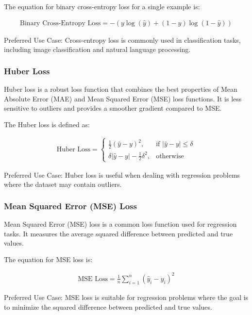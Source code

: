 The equation for binary cross-entropy loss for a single example is:

\begin{align}
	\text{Binary Cross-Entropy Loss} = -\left(y \log(\hat{y}) + (1 - y) \log(1 - \hat{y})\right)
\end{align}

Preferred Use Case: Cross-entropy loss is commonly used in classification tasks, including image classification and natural language processing.

\subsubsection{Huber Loss}

Huber loss is a robust loss function that combines the best properties of Mean Absolute Error (MAE) and Mean Squared Error (MSE) loss functions. It is less sensitive to outliers and provides a smoother gradient compared to MSE.

The Huber loss is defined as:

\begin{align}
	\text{Huber Loss} = \begin{cases}
		\frac{1}{2}(\hat{y} - y)^2, & \text{if } |\hat{y} - y| \leq \delta \\
		\delta|\hat{y} - y| - \frac{1}{2}\delta^2, & \text{otherwise}
	\end{cases}
\end{align}

Preferred Use Case: Huber loss is useful when dealing with regression problems where the dataset may contain outliers.

\subsubsection{Mean Squared Error (MSE) Loss}

Mean Squared Error (MSE) loss is a common loss function used for regression tasks. It measures the average squared difference between predicted and true values.

The equation for MSE loss is:

\begin{align}
	\text{MSE Loss} = \frac{1}{n} \sum_{i=1}^{n} (\hat{y}_i - y_i)^2    
\end{align}

Preferred Use Case: MSE loss is suitable for regression problems where the goal is to minimize the squared difference between predicted and true values.


